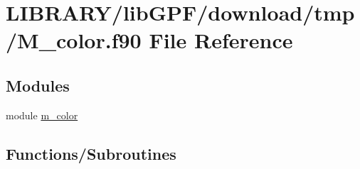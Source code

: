 \hypertarget{M__color_8f90}{}\section{L\+I\+B\+R\+A\+R\+Y/lib\+G\+P\+F/download/tmp/\+M\+\_\+color.f90 File Reference}
\label{M__color_8f90}
\subsection*{Modules}
\begin{DoxyCompactItemize}
\item 
module \hyperlink{namespacem__color}{m\+\_\+color}
\end{DoxyCompactItemize}
\subsection*{Functions/\+Subroutines}
